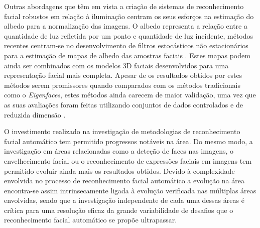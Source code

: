  Outras abordagens que têm em vista a criação de sistemas de reconhecimento facial robustos em relação à iluminação centram os seus esforços na estimação do albedo para a normalização das imagens. O albedo representa a relação entre a quantidade de luz refletida por um ponto e quantidade de luz incidente, métodos recentes centram-se no desenvolvimento de filtros estocásticos não estacionários para a estimação de mapas de albedo das amostras faciais \cite{Biswas2009}. Estes mapas podem ainda ser combinados com os modelos 3D faciais desenvolvidos para uma representação facial mais completa. Apesar de os resultados obtidos por estes métodos serem promissores quando comparados com os métodos tradicionais como o \textit{Eigenfaces}, estes métodos ainda carecem de maior validação, uma vez que as suas avaliações foram feitas utilizando conjuntos de dados controlados e de reduzida dimensão \cite{Chellappa2010}.
 
O investimento realizado na investigação de metodologias de reconhecimento facial automático tem permitido progressos notáveis na área. Do mesmo modo, a investigação em áreas relacionadas como a deteção de faces nas imagens, o envelhecimento facial ou o reconhecimento de expressões faciais em imagens tem permitido evoluir ainda mais os resultados obtidos. Devido à complexidade envolvida no processo de reconhecimento facial automático a evolução na área encontra-se assim intrinsecamente ligada à evolução verificada nas múltiplas áreas envolvidas, sendo que a investigação independente de cada uma dessas áreas é crítica para uma resolução eficaz da grande variabilidade de desafios que o reconhecimento facial automático se propõe ultrapassar.


